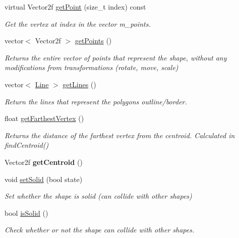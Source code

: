 \begin{DoxyCompactItemize}
virtual Vector2f \mbox{\hyperlink{class_polygon_a336e2540d24e30a4be6be163e2137323}{get\+Point}} (size\+\_\+t index) const
\begin{DoxyCompactList}\small\item\em Get the vertex at index in the vector m\+\_\+points. \end{DoxyCompactList}\item 
vector$<$ Vector2f $>$ \mbox{\hyperlink{class_polygon_a5013385231c9027d00cb57dffc030ae4}{get\+Points}} ()
\begin{DoxyCompactList}\small\item\em Returns the entire vector of points that represent the shape, without any modifications from transformations (rotate, move, scale) \end{DoxyCompactList}\item 
vector$<$ \mbox{\hyperlink{class_line}{Line}} $>$ \mbox{\hyperlink{class_polygon_acbeaa5a9990ee704fdfa766d4a34b86c}{get\+Lines}} ()
\begin{DoxyCompactList}\small\item\em Return the lines that represent the polygon\textquotesingle{}s outline/border. \end{DoxyCompactList}\item 
float \mbox{\hyperlink{class_polygon_aa4da77df0658cdcc0797443844c69a3f}{get\+Farthest\+Vertex}} ()
\begin{DoxyCompactList}\small\item\em Returns the distance of the farthest vertex from the centroid. Calculated in find\+Centroid() \end{DoxyCompactList}\item 
\mbox{\label{class_polygon_a70345633fc22991a66923b2b9db197fc}} 
Vector2f {\bfseries get\+Centroid} ()
\item 
void \mbox{\hyperlink{class_polygon_a0fc684c823f560d066bc8fdfe10fd8f0}{set\+Solid}} (bool state)
\begin{DoxyCompactList}\small\item\em Set whether the shape is solid (can collide with other shapes) \end{DoxyCompactList}\item 
bool \mbox{\hyperlink{class_polygon_a531b42b03e52789c8b9c6869933bf7d3}{is\+Solid}} ()
\begin{DoxyCompactList}\small\item\em Check whether or not the shape can collide with other shapes. \end{DoxyCompactList}\item 

\end{DoxyCompactItemize}
